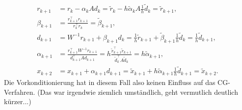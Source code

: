 \documentclass[english, parskip=full]{scrartcl}
\begin{document}
\begin{align}
r_{k+1} &= r_{k} - \alpha_kAd_k = \tilde{r}_k - h\tilde{\alpha}_k A \frac{1}{h} \tilde{d}_k = \tilde{r}_{k+1},\\
\beta_{k+1} &= \frac{r_{k+1}^\top r_{k+1}}{r_k^\top r_k} = \tilde{\beta}_{k+1},\\
d_{k+1} &= W^{-1}r_{k+1} + \beta_{k+1}d_{k} = \frac{1}{h}\tilde{r}_{k+1} + \tilde{\beta}_{k+1} \frac{1}{h} \tilde{d}_k = \frac{1}{h} \tilde{d}_{k+1},\\
\alpha_{k+1} &= \frac{r_{k+1}^\top W^{-1} r_{k+1}}{d_{k+1}^\top Ad_{k+1}} = h\frac{\tilde{r}_{k+1}^\top \tilde{r}_{k+1}}{\tilde{d}_k^\top A\tilde{d}_k} = h\tilde{\alpha}_{k+1},\\
x_{k+2} &= x_{k+1} + \alpha_{k+1} d_{k+1} = \tilde{x}_{k+1} + h \tilde{\alpha}_{k+1} \frac{1}{h} \tilde{d}_{k+1} = \tilde{x}_{k+2}.
\end{align}
Die Vorkonditionierung hat in diesem Fall also keinen Einfluss auf das CG-Verfahren.
(Das war irgendwie ziemlich umständlich, geht vermutlich deutlich kürzer...)
\end{document}
